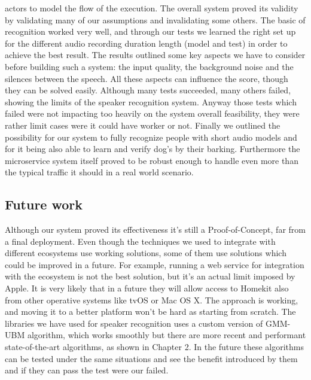 actors to model the flow of the execution.
The overall system proved its validity by validating many of our assumptions and
invalidating some others. The basic of recognition worked very well, and through
our tests we learned the right set up for the different audio recording duration length (model and test)
in order to achieve the best result. The results outlined some key aspects we have to consider
before building such a system: the input quality, the background noise and the silences between the speech.
All these aspects can influence the score, though they can be solved easily. Although many
tests succeeded, many others failed, showing the limits of the speaker recognition system. Anyway those
tests which failed were not impacting too heavily on the system overall feasibility, they were rather
limit cases were it could have worker or not.\newline
Finally we outlined the possibility for our system to fully recognize people with short
audio models and for it being also able to learn and verify dog's by their barking. Furthermore
the microservice system itself proved to be robust enough to handle even more than the typical
traffic it should in a real world scenario.


\subsection{Future work}

Although our system proved its effectiveness it's still a Proof-of-Concept,
far from a final deployment. Even though the techniques we used to integrate with
different ecosystems use working solutions, some of them use solutions
which could be improved in a future. For example, running a web service for integration
with the ecosystem is not the best solution, but it's an actual limit imposed by Apple.
It is very likely that in a future they will allow access to Homekit also from other
operative systems like tvOS or Mac OS X. The approach is working, and moving it to a better
platform won't be hard as starting from scratch.\newline
The libraries we have used for speaker recognition uses a custom version of GMM-UBM algorithm,
which works smoothly but there are more recent and performant state-of-the-art algorithms,
as shown in Chapter 2. In the future these algorithms can be tested under the same
situations and see the benefit introduced by them and if they can pass the test were
our failed.
